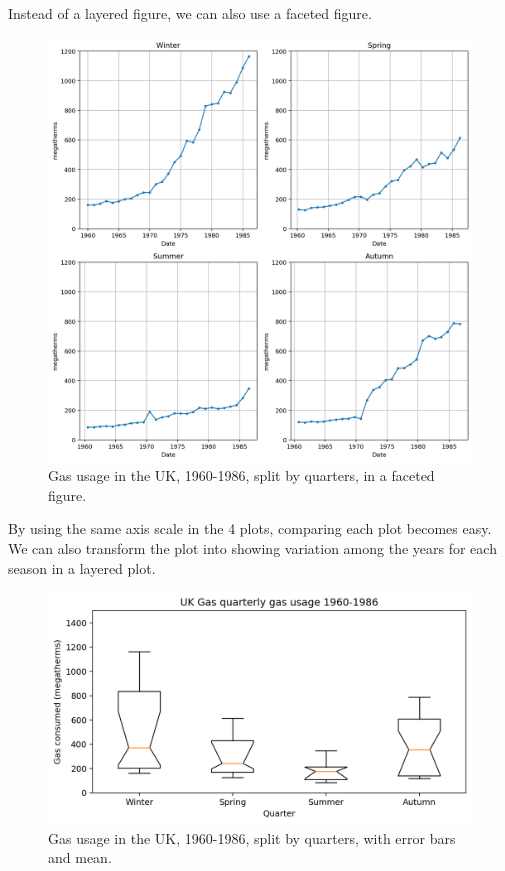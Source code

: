 \documentclass[a4paper, openany]{memoir}
\begin{document}
\noindent Instead of a layered figure, we can also use a faceted figure.
\begin{figure}[H]
    \centering
    \includegraphics[scale=0.4]{src/2.19 Gas Example Plot 4.png}
    \caption{Gas usage in the UK, 1960-1986, split by quarters, in a faceted figure.}
\end{figure}
\noindent By using the same axis scale in the 4 plots, comparing each plot becomes easy. We can also transform the plot into showing variation among the years for each season in a layered plot.
\begin{figure}[H]
    \centering
    \includegraphics[scale=0.4]{src/2.20 Gas Example Plot 5.png}
    \caption{Gas usage in the UK, 1960-1986, split by quarters, with error bars and mean.}
\end{figure}
\end{document}
